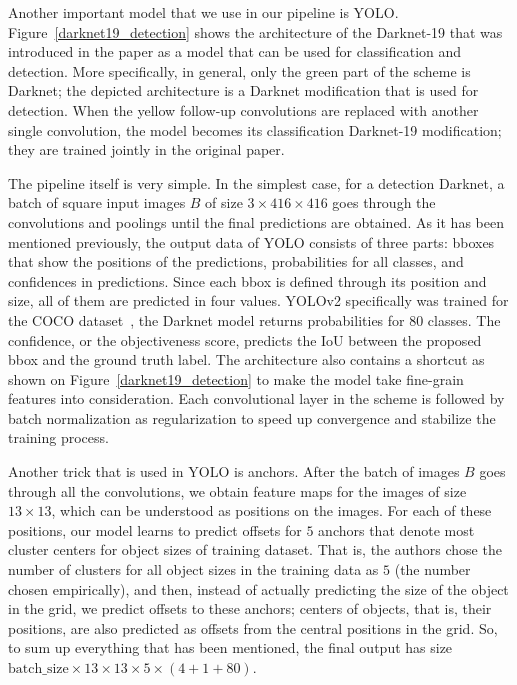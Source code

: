 Another important model that we use in our pipeline is YOLO.
Figure~\ref{darknet19_detection} shows the architecture of the Darknet-19 that was introduced in the paper as a model that can be used for classification and detection. 
More specifically, in general, only the green part of the scheme is Darknet; the depicted architecture is a Darknet modification that is used for detection. 
When the yellow follow-up convolutions are replaced with another single convolution, the model becomes its classification Darknet-19 modification; they are trained jointly in the original paper.

The pipeline itself is very simple. 
In the simplest case, for a detection Darknet, a batch of square input images $B$ of size $3\times 416\times 416$ goes through the convolutions and poolings until the final predictions are obtained.
As it has been mentioned previously, the output data of YOLO consists of three parts: bboxes that show the positions of the predictions, probabilities for all classes, and confidences in predictions. 
Since each bbox is defined through its position and size, all of them are predicted in four values.
YOLOv2 specifically was trained for the COCO dataset~\cite{cocodataset}, the Darknet model returns probabilities for 80 classes. 
The confidence, or the objectiveness score, predicts the IoU between the proposed bbox and the ground truth label. 
The architecture also contains a shortcut as shown on Figure~\ref{darknet19_detection} to make the model take fine-grain features into consideration.
Each convolutional layer in the scheme is followed by batch normalization as regularization to speed up convergence and stabilize the training process. 

Another trick that is used in YOLO is anchors. 
After the batch of images $B$ goes through all the convolutions, we obtain feature maps for the images of size $13\times 13$, which can be understood as positions on the images. 
For each of these positions, our model learns to predict offsets for $5$ anchors that denote most cluster centers for object sizes of training dataset. 
That is, the authors chose the number of clusters for all object sizes in the training data as $5$ (the number chosen empirically), and then, instead of actually predicting the size of the object in the grid, we predict offsets to these anchors; centers of objects, that is, their positions, are also predicted as offsets from the central positions in the grid.
So, to sum up everything that has been mentioned, the final output has size $\text{batch\_size}\times 13 \times 13\times 5\times (4 + 1 + 80)$.


